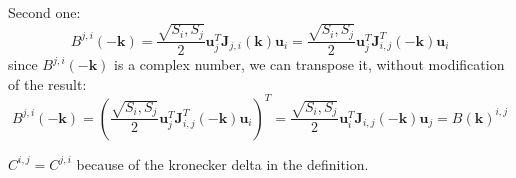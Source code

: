 Second one:
\begin{equation}
    B^{j,i}(-\boldsymbol{k}) = \dfrac{\sqrt{S_i, S_j}}{2}\boldsymbol{u}^T_j\boldsymbol{J}_{j,i}(\boldsymbol{k})\boldsymbol{u}_i =
    \dfrac{\sqrt{S_i, S_j}}{2}\boldsymbol{u}^T_j\boldsymbol{J}_{i,j}^T(-\boldsymbol{k})\boldsymbol{u}_i
\end{equation}
since $B^{j,i}(-\boldsymbol{k})$ is a complex number, we can transpose it, without modification of the result:
\begin{equation}
    B^{j,i}(-\boldsymbol{k}) =  (\dfrac{\sqrt{S_i, S_j}}{2}\boldsymbol{u}^T_j\boldsymbol{J}_{i,j}^T(-\boldsymbol{k})\boldsymbol{u}_i)^T =
    \dfrac{\sqrt{S_i, S_j}}{2}\boldsymbol{u}^T_i\boldsymbol{J}_{i,j}(-\boldsymbol{k})\boldsymbol{u}_j = B(\boldsymbol{k})^{i,j}
\end{equation}

$C^{i,j} = C^{j,i}$ because of the kronecker delta in the definition.
